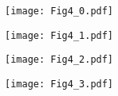 \documentclass[12pt]{article}
\begin{document}
 

\begin{figure}
\begin{minipage}{8cm}
\texttt{[image: Fig4\_0.pdf]}
\end{minipage}
\hfill
\begin{minipage}{9cm}
\hspace{0.2cm}
\hfill
\begin{minipage}{8cm}
\texttt{[image: Fig4\_1.pdf]}
\end{minipage}
\end{minipage}
\vfill
\begin{minipage}{8cm} 
\texttt{[image: Fig4\_2.pdf]}
\end{minipage}
\hfill
\begin{minipage}{9cm} 
\hspace{0.2cm}
\hfill
\begin{minipage}{8cm} 
\texttt{[image: Fig4\_3.pdf]}
\end{minipage}
\end{minipage}
%
\end{figure}
\end{document}
